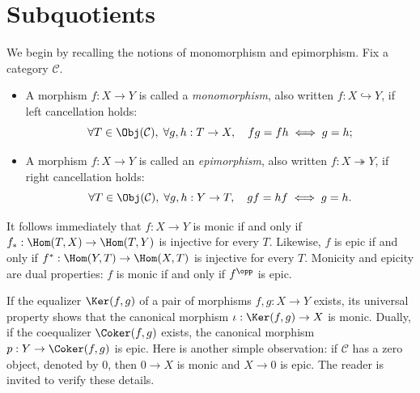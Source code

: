 
\section{Subquotients}\label{sec:subquot}
\hypertarget{o014.aljabr2.chapter1.subquotients}{ }

We begin by recalling the notions of monomorphism and epimorphism. Fix a
category $\mathcal C$.

\begin{itemize}
	\item A morphism $f:X\to Y$ is called a \emph{monomorphism}, also written
	$f:X\hookrightarrow Y$, if left cancellation holds:
	\[ \forall T \in \Obj(\mathcal{C}), \; \forall g,h: T \to X , \quad fg=fh \iff g=h; \]
	\item A morphism $f:X\to Y$ is called an \emph{epimorphism}, also written
	$f:X\twoheadrightarrow Y$, if right cancellation holds:
	\[ \forall T \in \Obj(\mathcal{C}), \; \forall g,h: Y \to T, \quad gf=hf \iff g=h. \]
\end{itemize}


It follows immediately that $f:X\to Y$ is monic if and only if
$f_*:\Hom(T,X)\to\Hom(T,Y)$ is injective for every $T$. Likewise, $f$ is
epic if and only if $f^*:\Hom(Y,T)\to\Hom(X,T)$ is injective for every $T$.
Monicity and epicity are dual properties: $f$ is monic if and only if
$f^{\opp}$ is epic.

\begin{example}
	If the equalizer $\Ker(f,g)$ of a pair of morphisms $f,g:X\to Y$ exists,
	its universal property shows that the canonical morphism
	$\iota:\Ker(f,g)\to X$ is monic. Dually, if the coequalizer
	$\Coker(f,g)$ exists, the canonical morphism $p:Y\to\Coker(f,g)$ is epic.
	Here is another simple observation: if $\mathcal C$ has a zero object,
	denoted by $0$, then $0\to X$ is monic and $X\to0$ is epic. The reader is
	invited to verify these details.
\end{example}

